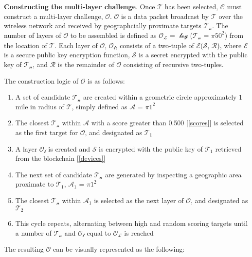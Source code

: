 \documentclass[letterpaper,11pt]{article}
\begin{document}
\textbf{Constructing the multi-layer challenge}. Once $\mathcal{T}$ has been selected, $\mathcal{C}$ must construct a multi-layer challenge, $\mathcal{O}$. $\mathcal{O}$ is a data packet broadcast by $\mathcal{T}$ over the wireless network and received by geographcially proximate targets $\mathcal{T_n}$. The number of layers of $\mathcal{O}$ to be assembled is defined as $\mathcal{O_L}$ = $\mathcal{\log}$($\mathcal{T_n}$ = $\mathcal{\pi}$$\mathcal{50^2}$) from the location of $\mathcal{T}$. Each layer of $\mathcal{O}$, $\mathcal{O_l}$, consists of a two-tuple of $\mathcal{E}$($\mathcal{S}$, $\mathcal{R}$), where $\mathcal{E}$ is a secure public key encryption function, $\mathcal{S}$ is a secret encrypted with the public key of $\mathcal{T_n}$, and $\mathcal{R}$ is the remainder of $\mathcal{O}$ consisting of recursive two-tuples.\newline

The construction logic of $\mathcal{O}$ is as follows:

\begin{enumerate}
  \item A set of candidate $\mathcal{T_n}$ are created within a geometric circle approximately 1 mile in radius of $\mathcal{T}$, simply defined as $\mathcal{A}$ = $\mathcal{\pi}$$\mathcal{1^2}$
  \item The closest $\mathcal{T_n}$ within $\mathcal{A}$ with a score greater than 0.500 [\ref{scores}] is selected as the first target for $\mathcal{O}$, and designated as $\mathcal{T_1}$
  \item A layer $\mathcal{O_l}$ is created and $\mathcal{S}$ is encrypted with the public key of $\mathcal{T_1}$ retrieved from the blockchain [\ref{devices}]
  \item The next set of candidate $\mathcal{T_n}$ are generated by inspecting a geographic area proximate to $\mathcal{T_1}$, $\mathcal{A_1}$ = $\mathcal{\pi}$$\mathcal{1^2}$
  \item The closest $\mathcal{T_n}$ within $\mathcal{A_1}$ is selected as the next layer of $\mathcal{O}$, and designated as $\mathcal{T_2}$
  \item This cycle repeats, alternating between high and random scoring targets until a number of $\mathcal{T_n}$ and $\mathcal{O_l}$ equal to $\mathcal{O_L}$ is reached
\end{enumerate}

The resulting $\mathcal{O}$ can be visually represented as the following:\newline
\end{document}
